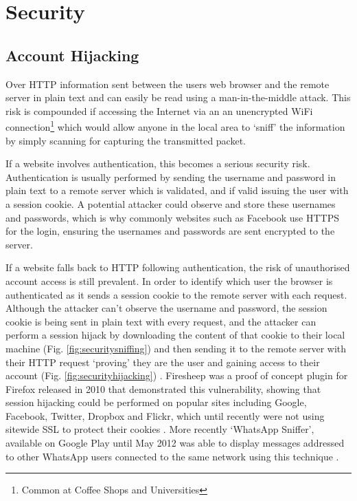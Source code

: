 \section{Security}
 

\subsection{Account Hijacking} \label{subsection:account-hijacking}
Over HTTP information sent between the users web browser and the remote server in plain text and can easily be read using a man-in-the-middle attack. This risk is compounded if accessing the Internet via an an unencrypted WiFi connection\footnote{Common at Coffee Shops and Universities} which would allow anyone in the local area to `sniff' the information by simply scanning for capturing the transmitted packet.

If a website involves authentication, this becomes a serious security risk. Authentication is usually performed by sending the username and password in plain text to a remote server which is validated, and if valid issuing the user with a session cookie.
%
A potential attacker could observe and store these usernames and passwords, which is why commonly websites such as Facebook use HTTPS for the login, ensuring the usernames and passwords are sent encrypted to the server.

If a website falls back to HTTP following authentication, the risk of unauthorised account access is still prevalent.
%
In order to identify which user the browser is authenticated as it sends a session cookie to the remote server with each request. 
%
Although the attacker can't observe the username and password, the session cookie is being sent in plain text with every request, and the attacker can perform a session hijack by downloading the content of that cookie to their local machine (Fig. \ref{fig:securitysniffing}) and then sending it to the remote server with their HTTP request `proving' they are the user and gaining access to their account (Fig. \ref{fig:securityhijacking}) \parencite{owasp2011sessionhihacking}.
% 
Firesheep was a proof of concept plugin for Firefox released in 2010 that demonstrated this vulnerability, showing that session hijacking could be performed on popular sites including Google, Facebook, Twitter, Dropbox and Flickr, which until recently were not using sitewide SSL to protect their cookies \parencite{butler2010firesheep, butler2014firesheep}. 
%
More recently `WhatsApp Sniffer', available on Google Play until May 2012 was able to display messages addressed to other WhatsApp users connected to the same network using this technique \parencite{thehsecurity2012whatsapp}.


